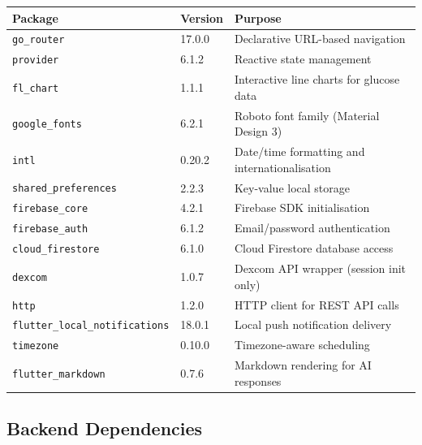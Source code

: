 \documentclass[12pt,a4paper]{article}
\begin{document}
\begin{longtable}{p{5.5cm} p{2cm} p{6.5cm}}
\toprule
\textbf{Package} & \textbf{Version} & \textbf{Purpose} \\
\midrule
\endhead
\texttt{go\_router} & 17.0.0 & Declarative URL-based navigation \\
\texttt{provider} & 6.1.2 & Reactive state management \\
\texttt{fl\_chart} & 1.1.1 & Interactive line charts for glucose data \\
\texttt{google\_fonts} & 6.2.1 & Roboto font family (Material Design 3) \\
\texttt{intl} & 0.20.2 & Date/time formatting and internationalisation \\
\texttt{shared\_preferences} & 2.2.3 & Key-value local storage \\
\texttt{firebase\_core} & 4.2.1 & Firebase SDK initialisation \\
\texttt{firebase\_auth} & 6.1.2 & Email/password authentication \\
\texttt{cloud\_firestore} & 6.1.0 & Cloud Firestore database access \\
\texttt{dexcom} & 1.0.7 & Dexcom API wrapper (session init only) \\
\texttt{http} & 1.2.0 & HTTP client for REST API calls \\
\texttt{flutter\_local\_notifications} & 18.0.1 & Local push notification delivery \\
\texttt{timezone} & 0.10.0 & Timezone-aware scheduling \\
\texttt{flutter\_markdown} & 0.7.6 & Markdown rendering for AI responses \\
\bottomrule
\end{longtable}

\subsection{Backend Dependencies}
\end{document}
